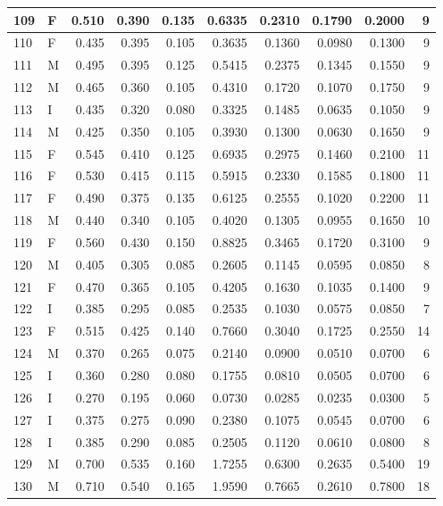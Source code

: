 \documentclass[9pt,twocolumn,twoside,]{pnas-new}
\begin{document}
\begin{tabular}{l|l|r|r|r|r|r|r|r|r}
\hline
109 & F & 0.510 & 0.390 & 0.135 & 0.6335 & 0.2310 & 0.1790 & 0.2000 & 9\\
\hline
110 & F & 0.435 & 0.395 & 0.105 & 0.3635 & 0.1360 & 0.0980 & 0.1300 & 9\\
\hline
111 & M & 0.495 & 0.395 & 0.125 & 0.5415 & 0.2375 & 0.1345 & 0.1550 & 9\\
\hline
112 & M & 0.465 & 0.360 & 0.105 & 0.4310 & 0.1720 & 0.1070 & 0.1750 & 9\\
\hline
113 & I & 0.435 & 0.320 & 0.080 & 0.3325 & 0.1485 & 0.0635 & 0.1050 & 9\\
\hline
114 & M & 0.425 & 0.350 & 0.105 & 0.3930 & 0.1300 & 0.0630 & 0.1650 & 9\\
\hline
115 & F & 0.545 & 0.410 & 0.125 & 0.6935 & 0.2975 & 0.1460 & 0.2100 & 11\\
\hline
116 & F & 0.530 & 0.415 & 0.115 & 0.5915 & 0.2330 & 0.1585 & 0.1800 & 11\\
\hline
117 & F & 0.490 & 0.375 & 0.135 & 0.6125 & 0.2555 & 0.1020 & 0.2200 & 11\\
\hline
118 & M & 0.440 & 0.340 & 0.105 & 0.4020 & 0.1305 & 0.0955 & 0.1650 & 10\\
\hline
119 & F & 0.560 & 0.430 & 0.150 & 0.8825 & 0.3465 & 0.1720 & 0.3100 & 9\\
\hline
120 & M & 0.405 & 0.305 & 0.085 & 0.2605 & 0.1145 & 0.0595 & 0.0850 & 8\\
\hline
121 & F & 0.470 & 0.365 & 0.105 & 0.4205 & 0.1630 & 0.1035 & 0.1400 & 9\\
\hline
122 & I & 0.385 & 0.295 & 0.085 & 0.2535 & 0.1030 & 0.0575 & 0.0850 & 7\\
\hline
123 & F & 0.515 & 0.425 & 0.140 & 0.7660 & 0.3040 & 0.1725 & 0.2550 & 14\\
\hline
124 & M & 0.370 & 0.265 & 0.075 & 0.2140 & 0.0900 & 0.0510 & 0.0700 & 6\\
\hline
125 & I & 0.360 & 0.280 & 0.080 & 0.1755 & 0.0810 & 0.0505 & 0.0700 & 6\\
\hline
126 & I & 0.270 & 0.195 & 0.060 & 0.0730 & 0.0285 & 0.0235 & 0.0300 & 5\\
\hline
127 & I & 0.375 & 0.275 & 0.090 & 0.2380 & 0.1075 & 0.0545 & 0.0700 & 6\\
\hline
128 & I & 0.385 & 0.290 & 0.085 & 0.2505 & 0.1120 & 0.0610 & 0.0800 & 8\\
\hline
129 & M & 0.700 & 0.535 & 0.160 & 1.7255 & 0.6300 & 0.2635 & 0.5400 & 19\\
\hline
130 & M & 0.710 & 0.540 & 0.165 & 1.9590 & 0.7665 & 0.2610 & 0.7800 & 18\\

\end{tabular}
\end{document}
